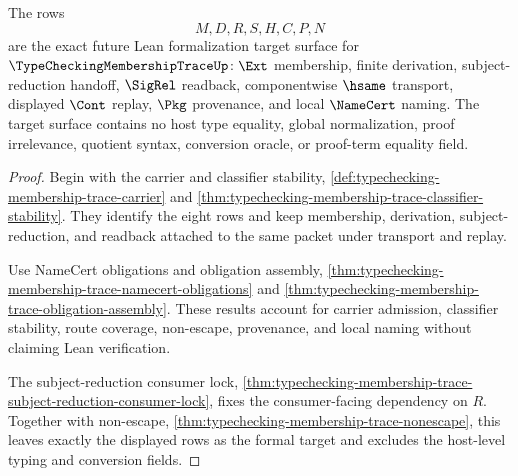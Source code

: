 \begin{theorem}
\label{thm:typechecking-membership-trace-formal-target-handoff}
The rows
$$
M,D,R,S,H,C,P,N
$$
are the exact future Lean formalization target surface for $\TypeCheckingMembershipTraceUp$: $\Ext$ membership, finite derivation, subject-reduction handoff, $\SigRel$ readback, componentwise $\hsame$ transport, displayed $\Cont$ replay, $\Pkg$ provenance, and local $\NameCert$ naming. The target surface contains no host type equality, global normalization, proof irrelevance, quotient syntax, conversion oracle, or proof-term equality field.
\end{theorem}
\begin{proof}
Begin with the carrier and classifier stability, \autoref{def:typechecking-membership-trace-carrier} and \autoref{thm:typechecking-membership-trace-classifier-stability}. They identify the eight rows and keep membership, derivation, subject-reduction, and readback attached to the same packet under transport and replay.

Use NameCert obligations and obligation assembly, \autoref{thm:typechecking-membership-trace-namecert-obligations} and \autoref{thm:typechecking-membership-trace-obligation-assembly}. These results account for carrier admission, classifier stability, route coverage, non-escape, provenance, and local naming without claiming Lean verification.

The subject-reduction consumer lock, \autoref{thm:typechecking-membership-trace-subject-reduction-consumer-lock}, fixes the consumer-facing dependency on $R$. Together with non-escape, \autoref{thm:typechecking-membership-trace-nonescape}, this leaves exactly the displayed rows as the formal target and excludes the host-level typing and conversion fields.
\end{proof}

